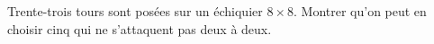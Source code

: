 Trente-trois tours sont posées sur un échiquier $8 \times 8$. Montrer qu'on peut en choisir cinq qui ne s'attaquent pas deux à deux.
